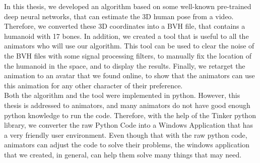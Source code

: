 In this thesis, we developed an algorithm based on some well-known pre-trained deep neural networks, that can estimate the 3D human pose from a video. Therefore, we converted these 3D coordinates into a BVH file, that contains a humanoid with 17 bones. In addition, we created a tool that is useful to all the animators who will use our algorithm. This tool can be used to clear the noise of the BVH files with some signal processing filters, to manually fix the location of the humanoid in the space, and to display the results. Finally, we retarget the animation to an avatar that we found online, to show that the animators can use this animation for any other character of their preference. \\

Both the algorithm and the tool were implemented in python. However, this thesis is addressed to animators, and many animators do not have good enough python knowledge to run the code. Therefore, with the help of the Tinker python library, we converter the raw Python Code into a Windows Application that has a very friendly user environment. Even though that with the raw python code, animators can adjust the code to solve their problems, the windows application that we created, in general, can help them solve many things that may need.